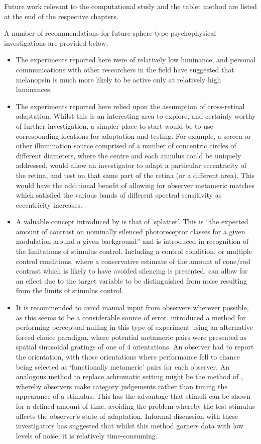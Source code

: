 Future work relevant to the computational study and the tablet method are listed at the end of the respective chapters. 

A number of recommendations for future sphere-type psychophysical investigations are provided below.

\begin{itemize}
\item The experiments reported here were of relatively low luminance, and personal communications with other researchers in the field have suggested that melanopsin is much more likely to be active only at relatively high luminances.
\item The experiments reported here relied upon the assumption of cross-retinal adaptation. Whilst this is an interesting area to explore, and certainly worthy of further investigation, a simpler place to start would be to use corresponding locations for adaptation and testing. For example, a screen or other illumination source comprised of a number of concentric circles of different diameters, where the centre and each annulus could be uniquely addressed, would allow an investigator to adapt a particular eccentricity of the retina, and test on that same part of the retina (or a different area). This would have the additional benefit of allowing for observer metameric matches which satisfied the various bands of different spectral sensitivity as eccentricity increases.
\item A valuable concept introduced by \citet{spitschan_selective_2015} is that of `splatter'. This is ``the expected amount of contrast on nominally silenced photoreceptor
classes for a given modulation around a given background'' and is introduced in recognition of the limitations of stimulus control. Including a control condition, or multiple control conditions, where a conservative estimate of the amount of cone/rod contrast which is likely to have avoided silencing is presented, can allow for an effect due to the target variable to be distinguished from noise resulting from the limits of stimulus control. 
\item It is recommended to avoid manual input from observers wherever possible, as this seems to be a considerable source of error. \citet{allen_form_2019} introduced a method for performing perceptual nulling in this type of experiment using an alternative forced choice paradigm, where potential metameric pairs were presented as spatial sinusoidal gratings of one of 4 orientations. An observer had to report the orientation, with those orientations where performance fell to chance being selected as `functionally metameric' pairs for each observer. An analogous method to replace achromatic setting might be the method of \citet{smithson_colour_2004}, whereby observers make category judgements rather than tuning the appearance of a stimulus. This has the advantage that stimuli can be shown for a defined amount of time, avoiding the problem whereby the test stimulus affects the observer's state of adaptation. Informal discussion with these investigators has suggested that whilst this method garners data with low levels of noise, it is relatively time-consuming.

\end{itemize}
